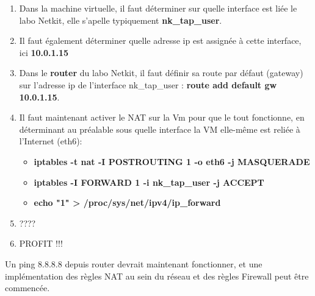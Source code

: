 \documentclass[a4paper,10pt,final,fleqn]{article}
\begin{document}
	\begin{enumerate}
		\item Dans la machine virtuelle, il faut déterminer sur quelle interface est liée le labo Netkit, elle s'apelle typiquement \textbf{nk_tap_user}.\\
		\item Il faut également déterminer quelle adresse ip est assignée à cette interface, ici \textbf{10.0.1.15}\\
		\item Dans le \textbf{router} du labo Netkit, il faut définir sa route par défaut (gateway) sur l'adresse ip de l'interface nk_tap_user : \textbf{route add default gw 10.0.1.15}.\\
		\item Il faut maintenant activer le NAT sur la Vm pour que le tout fonctionne, en déterminant au préalable sous quelle interface la VM elle-même est reliée à l'Internet (eth6): \\
		\begin{itemize}
			\item \textbf{iptables -t nat -I POSTROUTING 1 -o eth6 -j MASQUERADE}
			\item \textbf{iptables -I FORWARD 1 -i nk_tap_user -j ACCEPT}
			\item \textbf{echo "1" > /proc/sys/net/ipv4/ip_forward}
		\end{itemize}

		\item ????
		\item PROFIT !!!
	\end{enumerate}

	Un ping 8.8.8.8 depuis router devrait maintenant fonctionner, et une implémentation des règles NAT au sein du réseau et des règles Firewall peut être commencée.\\
\end{document}
